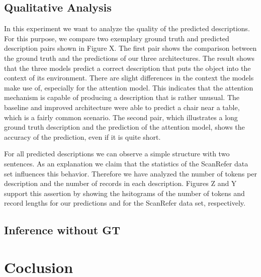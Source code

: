 \documentclass[10pt,twocolumn,letterpaper]{article}
\begin{document}
\subsection{Qualitative Analysis}
In this experiment we want to analyze the quality of the predicted descriptions. For this purpose, we compare two exemplary ground truth and predicted description pairs shown in Figure X. 
The first pair shows the comparison between the ground truth and the predictions of our three architectures. The result shows that the three models predict a correct description that puts the object into the context of its environment. There are slight differences in the context the models make use of, especially for the attention model. This indicates that the attention mechanism is capable of producing a description that is rather unusual. The baseline and improved architecture were able to predict a chair near a table, which is a fairly common scenario. 
The second pair, which illustrates a long ground truth description and the prediction of the attention model, shows the accuracy of the prediction, even if it is quite short. 

For all predicted descriptions we can observe a simple structure with two sentences. As an explanation we claim that the statistics of the ScanRefer data set influences this behavior. Therefore we have analyzed the number of tokens per description and the number of records in each description. Figures Z and Y support this assertion by showing the hsitograms of the number of tokens and record lengths for our predictions and for the ScanRefer data set, respectively.


\subsection{Inference without GT}

\section{Coclusion}
\end{document}
